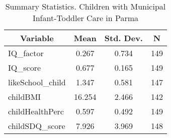 
\begin{table}[htbp]\centering \caption{Summary Statistics. Children with Municipal Infant-Toddler Care in Parma \label{bothChildasiloMuniParma}}
\begin{tabular}{l c c  c}\hline\hline
\multicolumn{1}{c}{\textbf{Variable}} & \textbf{Mean}
 & \textbf{Std. Dev.} & \textbf{N}\\ \hline
IQ\_factor & 0.267 & 0.734  & 149\\
IQ\_score & 0.677 & 0.165  & 149\\
likeSchool\_child & 1.347 & 0.581  & 147\\
childBMI & 16.254 & 2.466  & 142\\
childHealthPerc & 0.597 & 0.492  & 149\\
childSDQ\_score & 7.926 & 3.969  & 148\\
\hline\end{tabular}
\end{table}
